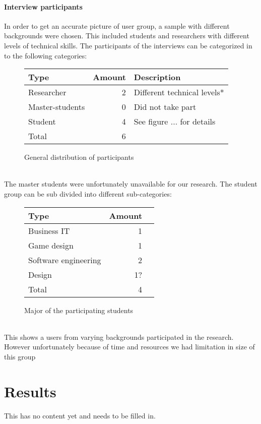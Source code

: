 \documentclass[conference]{IEEEtran}
\begin{document}
	\paragraph{Interview participants}
		In order to get an accurate picture of user group, a sample with different backgrounds were chosen. This included students and researchers with different levels of technical skills. The participants of the interviews can be categorized in to the following categories:
		\begin{figure}[ht]
			\centering
			\begin{tabular}{ | l | r | l | }
				\hline
				Type			& Amount	& Description \\ \hline \hline
				Researcher		& 2			& Different technical levels* \\ \hline
				Master-students	& 0			& Did not take part \\ \hline \hline
				Student			& 4			& See figure ... for details \\ \hline \hline
				Total			& 6			& \\ \hline
			\end{tabular}
			\caption{General distribution of participants}
		\end{figure}\\
		The master students were unfortunately unavailable for our research. The student group can be sub divided into different sub-categories:
		\begin{figure}[ht]
			\centering
			\begin{tabular}{ | l | r | l | }
				\hline
				Type					& Amount \\ \hline \hline
				Business IT				& 1 \\ \hline
				Game design				& 1 \\ \hline
				Software engineering	& 2 \\ \hline
				Design					& 1? \\ \hline \hline
				Total					& 4 \\ \hline
			\end{tabular}
			\caption{Major of the participating students}
		\end{figure} \\
		This shows a users from varying backgrounds participated in the research. However unfortunately because of time and resources we had limitation in size of this group
\section{Results}
This has no content yet and needs to be filled in. 
\end{document}
